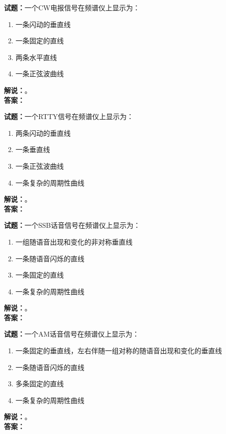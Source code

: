 \documentclass{ctexbook}
\begin{document}
\noindent\textbf{试题：}一个CW电报信号在频谱仪上显示为：
\begin{enumerate}[leftmargin=3em]
  \item 一条闪动的垂直线
  \item 一条固定的直线
  \item 两条水平直线
  \item 一条正弦波曲线
\end{enumerate}
\noindent\textbf{解说：}\textbf{}。\\\noindent\textbf{答案：}

\bigskip

\noindent\textbf{试题：}一个RTTY信号在频谱仪上显示为：
\begin{enumerate}[leftmargin=3em]
  \item 两条闪动的垂直线
  \item 一条垂直线
  \item 一条正弦波曲线
  \item 一条复杂的周期性曲线
\end{enumerate}
\noindent\textbf{解说：}\textbf{}。\\\noindent\textbf{答案：}

\bigskip

\noindent\textbf{试题：}一个SSB话音信号在频谱仪上显示为：
\begin{enumerate}[leftmargin=3em]
  \item 一组随语音出现和变化的非对称垂直线
  \item 一条随语音闪烁的直线
  \item 一条固定的直线
  \item 一条复杂的周期性曲线
\end{enumerate}
\noindent\textbf{解说：}\textbf{}。\\\noindent\textbf{答案：}

\bigskip

\noindent\textbf{试题：}一个AM话音信号在频谱仪上显示为：
\begin{enumerate}[leftmargin=3em]
  \item 一条固定的垂直线，左右伴随一组对称的随语音出现和变化的垂直线
  \item 一条随语音闪烁的直线
  \item 多条固定的直线
  \item 一条复杂的周期性曲线
\end{enumerate}
\noindent\textbf{解说：}\textbf{}。\\\noindent\textbf{答案：}

\bigskip
\end{document}
